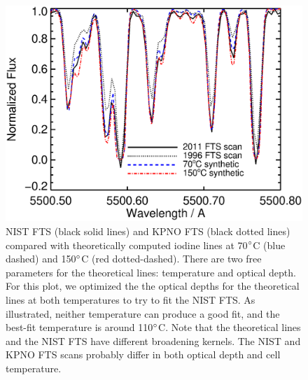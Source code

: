 \begin{figure}
\centering
\includegraphics[scale=0.5]{het/HET_NIST_temp.eps}
\caption{NIST FTS (black solid lines) and KPNO FTS (black dotted
  lines) compared with theoretically computed iodine lines at
  70$^{\circ}$C (blue dashed) and 150$^{\circ}$C (red
  dotted-dashed). There are two free parameters for the theoretical
  lines: temperature and optical depth. For this plot, we optimized
  the the optical depths for the theoretical lines at both
  temperatures to try to fit the NIST FTS. As illustrated, neither
  temperature can produce a good fit, and the best-fit temperature is
  around 110$^{\circ}$C. Note that the theoretical lines and the NIST
  FTS have different broadening kernels. The NIST and KPNO FTS scans
  probably differ in both optical depth and cell temperature.
\label{het:fig:iodspec5}}
\end{figure}


